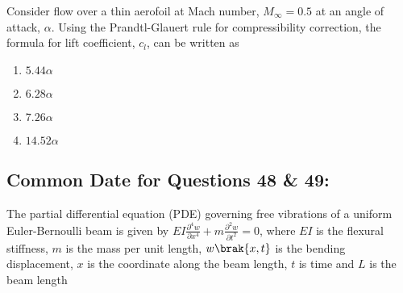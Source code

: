 \item Consider flow over a thin aerofoil at Mach number, $M_{\infty} = 0.5$ at an angle of attack, $\alpha$. Using the Prandtl-Glauert rule for compressibility correction, the formula for lift coefficient, $c_l$, can be written as
\begin{multicols}{2}
    \begin{enumerate}
        \item $5.44 \alpha$
        \item $6.28\alpha$
        \item $7.26\alpha$
        \item $14.52 \alpha$
    \end{enumerate}
\end{multicols}

\subsection*{Common Date for Questions 48 \& 49:}
The partial differential equation (PDE) governing free vibrations of a uniform Euler-Bernoulli beam is given by $EI \frac{\partial^4 w}{\partial x^4} + m \frac{\partial^2 w}{\partial t^2} = 0$, where $EI$ is the flexural stiffness, $m$ is the mass per unit length, $w\brak{x,t}$ is the bending displacement, $x$ is the coordinate along the beam length, $t$ is time and $L$ is the beam length
\centering
{}

